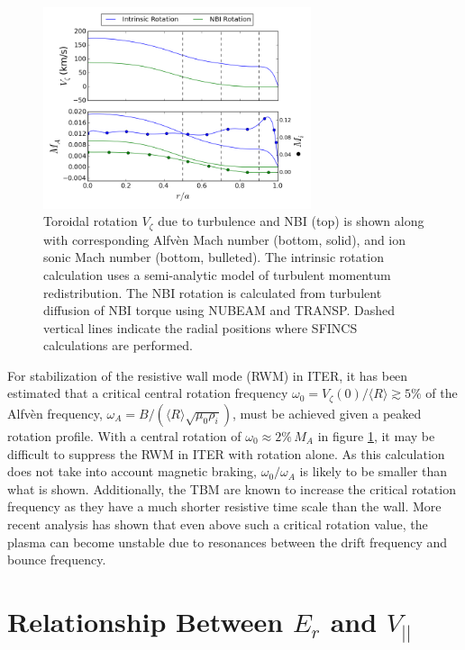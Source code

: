\documentclass[aip, pop, preprint]{revtex4-1}
\numberwithin{figure}{section}
\numberwithin{equation}{section}
\begin{document}
\FloatBarrier

\begin{figure}[h!]
\centering
\includegraphics[width=0.7\textwidth]{rotationestimate.png}
\caption{\label{fig:rotation_estimate} Toroidal rotation $V_{\zeta}$ due to turbulence and NBI (top) is shown along with  corresponding Alfv\`{e}n Mach number (bottom, solid), and ion sonic Mach number (bottom, bulleted). The intrinsic rotation calculation uses a semi-analytic model of turbulent momentum redistribution.\cite{Hillesheim2015} The NBI rotation is calculated from turbulent diffusion of NBI torque using NUBEAM and TRANSP.\cite{Poli2014} Dashed vertical lines indicate the radial positions where SFINCS calculations are performed. }
\end{figure}

For stabilization of the resistive wall mode (RWM) in ITER, it has been estimated that a critical central rotation frequency $\omega_0 = V_{\zeta}(0)/\langle R \rangle \gtrsim 5\%$ of the Alfv\`{e}n frequency, $\omega_A = B/(\langle R\rangle\sqrt{\mu_0 \rho_i})$, must be achieved given a peaked rotation profile.\cite{Liu2004} With a central rotation of $\omega_0 \approx 2\% \, M_A$ in figure \ref{fig:rotation_estimate}, it may be difficult to suppress the RWM in ITER with rotation alone. As this calculation does not take into account magnetic braking, $\omega_0/\omega_A$ is likely to be smaller than what is shown. Additionally, the TBM are known to increase the critical rotation frequency as they have a much shorter resistive time scale than the wall.\cite{Liu2004} More recent analysis has shown that even above such a critical rotation value, the plasma can become unstable due to resonances between the drift frequency and bounce frequency.\cite{Berkery2010, Liu2009}

\FloatBarrier

\section{Relationship Between $E_r$ and $V_{||}$}\label{Erandv}
\end{document}
